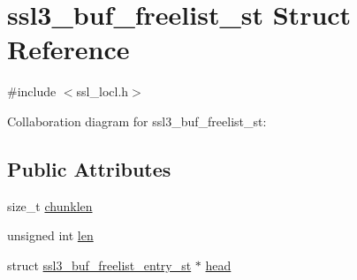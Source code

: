 \hypertarget{structssl3__buf__freelist__st}{\section{ssl3\-\_\-buf\-\_\-freelist\-\_\-st Struct Reference}
\label{structssl3__buf__freelist__st}
}


{\ttfamily \#include $<$ssl\-\_\-locl.\-h$>$}



Collaboration diagram for ssl3\-\_\-buf\-\_\-freelist\-\_\-st\-:
\subsection*{Public Attributes}
\begin{DoxyCompactItemize}
\item 
size\-\_\-t \hyperlink{structssl3__buf__freelist__st_a7a2667b7570a0139e5fca958b230cfc5}{chunklen}
\item 
unsigned int \hyperlink{structssl3__buf__freelist__st_a625bc725b998ae8b8228d99c6e7d523e}{len}
\item 
struct \hyperlink{structssl3__buf__freelist__entry__st}{ssl3\-\_\-buf\-\_\-freelist\-\_\-entry\-\_\-st} $\ast$ \hyperlink{structssl3__buf__freelist__st_abe3d954757ec9de9f78eefb7de4916ec}{head}
\end{DoxyCompactItemize}


